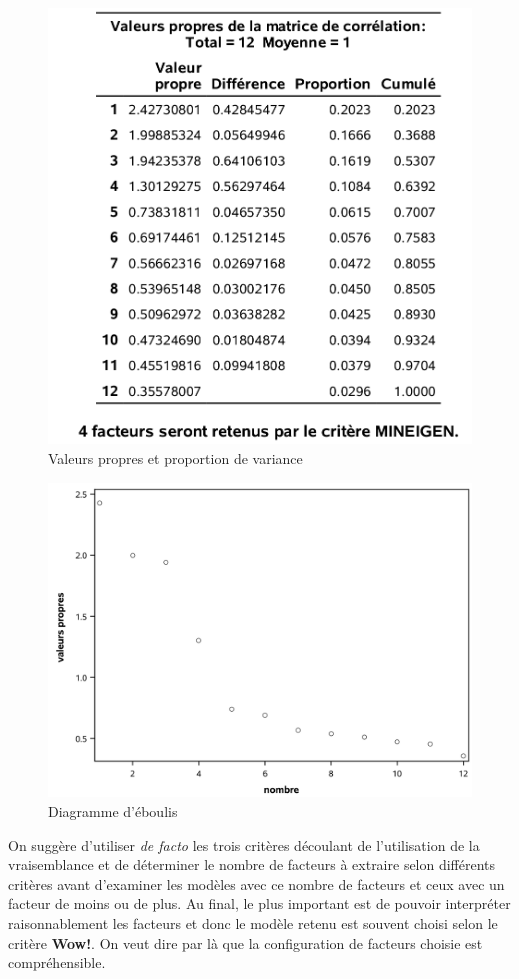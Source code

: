 \documentclass[
]{book}
\theoremstyle{definition}
\theoremstyle{definition}
\theoremstyle{definition}
\theoremstyle{remark}
\begin{document}
\begin{figure}

{\centering \includegraphics[width=0.65\linewidth]{figures/01-facto-e7} 

}

\caption{Valeurs propres et proportion de variance}\label{fig:fig1p7}
\end{figure}

\begin{figure}

{\centering \includegraphics[width=0.65\linewidth]{figures/01-facto-e6} 

}

\caption{Diagramme d'éboulis}\label{fig:fig1p6}
\end{figure}

On suggère d'utiliser \emph{de facto} les trois critères découlant de l'utilisation de la vraisemblance et de déterminer le nombre de facteurs à extraire selon différents critères avant d'examiner les modèles avec ce nombre de facteurs et ceux
avec un facteur de moins ou de plus. Au final, le plus important est de pouvoir interpréter raisonnablement les facteurs et donc le modèle retenu est souvent choisi selon le critère \textbf{Wow!}. On veut dire par là que la configuration de facteurs choisie est compréhensible.
\end{document}
